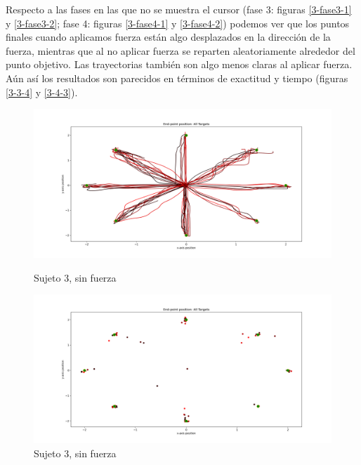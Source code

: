 \documentclass[a4paper,11pt, oneside]{book}
\begin{document}
Respecto a las fases en las que no se muestra el cursor (fase 3: figuras \ref{3-fase3-1} y \ref{3-fase3-2}; fase 4: figuras \ref{3-fase4-1} y \ref{3-fase4-2}) podemos ver que los puntos finales cuando aplicamos fuerza están algo desplazados en la dirección de la fuerza, mientras que al no aplicar fuerza se reparten aleatoriamente alrededor del punto objetivo. Las trayectorias también son algo menos claras al aplicar fuerza. Aún así los resultados son parecidos en términos de exactitud y tiempo (figuras \ref{3-3-4} y \ref{3-4-3}).

\begin{figure}[H]
	\begin{minipage}[b]{0.5\linewidth}
		\centering
		\includegraphics[width=\linewidth]{sujeto3/no_force/trayectorias}
		\caption{Sujeto 3, sin fuerza}
		\label{3-fase1-1}
	\end{minipage}
	\hspace{0.5cm}
	\begin{minipage}[b]{0.5\linewidth}
		\centering
		\includegraphics[width=\linewidth]{sujeto3/no_force/trayectorias_puntos}
		\caption{Sujeto 3, sin fuerza}
		\label{3-fase1-2}
	\end{minipage}
\end{figure}
\end{document}
